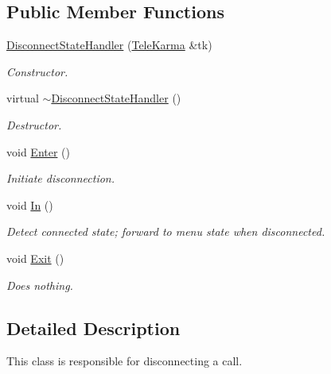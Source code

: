 \subsection*{Public Member Functions}
\begin{CompactItemize}
\item 
\hyperlink{classDisconnectStateHandler_b709ff60114f2c969990472c0ff4c7fd}{DisconnectStateHandler} (\hyperlink{classTeleKarma}{TeleKarma} \&tk)
\begin{CompactList}\small\item\em Constructor. \item\end{CompactList}\item 
virtual \hyperlink{classDisconnectStateHandler_a0192a1bd52d0d9b8838e121af27bba5}{$\sim$DisconnectStateHandler} ()
\begin{CompactList}\small\item\em Destructor. \item\end{CompactList}\item 
void \hyperlink{classDisconnectStateHandler_29fb86c820ff7ff183051170161347eb}{Enter} ()
\begin{CompactList}\small\item\em Initiate disconnection. \item\end{CompactList}\item 
void \hyperlink{classDisconnectStateHandler_7c8ad84d526c43376d480ce6dc1e8cc3}{In} ()
\begin{CompactList}\small\item\em Detect connected state; forward to menu state when disconnected. \item\end{CompactList}\item 
void \hyperlink{classDisconnectStateHandler_3b5e52496b753f788c886808dae652b9}{Exit} ()
\begin{CompactList}\small\item\em Does nothing. \item\end{CompactList}\end{CompactItemize}


\subsection{Detailed Description}
This class is responsible for disconnecting a call. 

